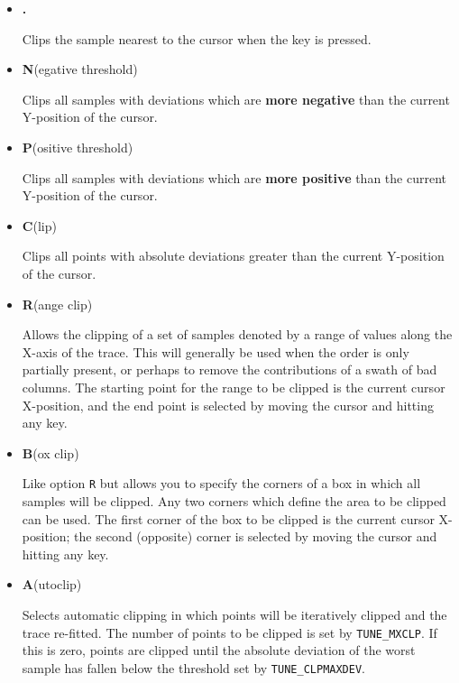 \documentclass[twoside,11pt,nolof]{starlink}
\newcommand{\mlabel}[1]{\xlabel{#1}\label{#1}}
\newcommand{\sunspec}[2]{#2}
\begin{document}
\mlabel{clip_menu}
\begin{itemize}

\item {\sunspec{\Large\tt}{\bf} .}

     Clips the sample nearest to the cursor when the key is pressed.

\item {\sunspec{\Large\tt}{\bf} N}(egative threshold)

     Clips all samples with deviations which are
     {\bf more negative} than the current Y-position of the cursor.

\item {\sunspec{\Large\tt}{\bf} P}(ositive threshold)

     Clips all samples with deviations which are
     {\bf more positive} than the current Y-position of the cursor.


\item {\sunspec{\Large\tt}{\bf} C}(lip)

     Clips all points with absolute deviations greater than the current
     Y-position of the cursor.

\item {\sunspec{\Large\tt}{\bf} R}(ange clip)

     Allows the clipping of a set of samples denoted by a range
     of values along the X-axis of the trace. This will generally be used
     when the order is only partially present, or perhaps to remove
     the contributions of a swath of bad columns. The starting point for
     the range to be clipped is the current cursor X-position, and the
     end point is selected by moving the cursor and hitting any key.

\item {\sunspec{\Large\tt}{\bf} B}(ox clip)

     Like option \texttt{R} but allows you to specify the corners of
     a box in which all samples will be clipped.  Any two corners
     which define the area to be clipped can be used.
     The first corner of the box to be clipped is the current
     cursor X-position; the second (opposite) corner
     is selected by moving the cursor and hitting any key.

\item {\sunspec{\Large\tt}{\bf} A}(utoclip)

     Selects automatic clipping in which points will be
     iteratively clipped and the trace re-fitted. The number of points
     to be clipped is set by {\tt TUNE\_MXCLP}.  If this is zero,
     points are clipped until the absolute deviation of the worst
     sample has fallen below the threshold set by {\tt TUNE\_CLPMAXDEV}.



\end{itemize}
\end{document}
